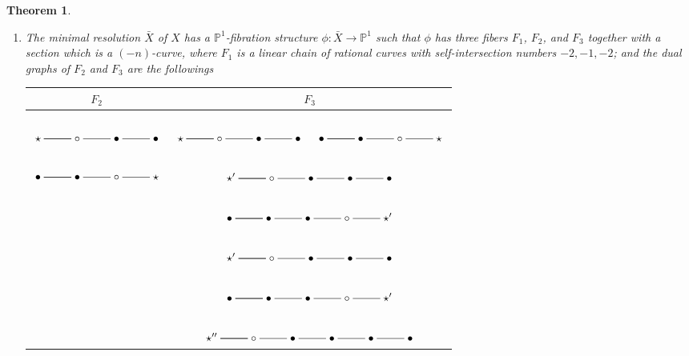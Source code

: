 \documentclass[10pt,oneside,reqno]{amsart}
\newcommand{\pp}{\mathbb{P}}
\newtheorem{theorem}{Theorem}[section]
\theoremstyle{definition}
\theoremstyle{remark}
\numberwithin{equation}{section}
\begin{document}
\begin{theorem}
\begin{enumerate}
$$
\xymatrix@R=0.8em{
&\bullet&&&&\bullet\\
\bullet\ar@{-}[r]&\ast\ar@{-}[r]\ar@{-}[u]&\ast\ar@{-}[r]&\cdots\ar@{-}[r]&\ast\ar@{-}[r]&\ast\ar@{-}[r]\ar@{-}[u]&\bullet
}
$$
where $\bullet$ denotes a $(-2)$-curve, the linear chain of $\ast$'s denotes $R_{k1}$.
\item The minimal resolution $\bar{X}$ of $X$  has a $\pp^1$-fibration structure $\phi:\bar{X} \rightarrow \pp^1$ such that $\phi$ has three fibers $F_1$, $F_2$, and $F_3$ together with a section which is a $(-n)$-curve, where $F_1$ is a linear chain of rational curves with self-intersection numbers $-2,-1,-2$; and
the dual graphs of $F_2$ and $F_3$ are the followings\\
\begin{tabular}{|c|c|}
\hline $F_2$ & $F_3$\\
\hline $\xymatrix@R=0.8em{\\
\star\ar@{-}[r]\ar@{-}[r]&\circ\ar@{-}[r]&\bullet\ar@{-}[r]&\bullet
}$ & $\xymatrix@R=0.8em{\\
\star\ar@{-}[r]\ar@{-}[r]&\circ\ar@{-}[r]&\bullet\ar@{-}[r]&\bullet
}\quad \xymatrix@R=0.8em{\\
\bullet\ar@{-}[r]\ar@{-}[r]&\bullet\ar@{-}[r]&\circ\ar@{-}[r]&\star
}$\\
$\xymatrix@R=0.8em{\\
\bullet\ar@{-}[r]\ar@{-}[r]&\bullet\ar@{-}[r]&\circ\ar@{-}[r]&\star
}$ & $\xymatrix@R=0.8em{\\
\star'\ar@{-}[r]\ar@{-}[r]&\circ\ar@{-}[r]&\bullet\ar@{-}[r]&\bullet\ar@{-}[r]&\bullet
}$\\
& $\xymatrix@R=0.8em{\\
\bullet\ar@{-}[r]\ar@{-}[r]&\bullet\ar@{-}[r]&\bullet\ar@{-}[r]&\circ\ar@{-}[r]&\star'
}$\\
& $\xymatrix@R=0.8em{\\
\star'\ar@{-}[r]\ar@{-}[r]&\circ\ar@{-}[r]&\bullet\ar@{-}[r]&\bullet\ar@{-}[r]&\bullet
}$ \\ & $\xymatrix@R=0.8em{\\
\bullet\ar@{-}[r]\ar@{-}[r]&\bullet\ar@{-}[r]&\bullet\ar@{-}[r]&\circ\ar@{-}[r]&\star'
}$\\
& $\xymatrix@R=0.8em{\\
\star''\ar@{-}[r]\ar@{-}[r]&\circ\ar@{-}[r]&\bullet\ar@{-}[r]&\bullet\ar@{-}[r]&\bullet\ar@{-}[r]&\bullet
}$\\

\end{tabular}
\end{enumerate}
\end{theorem}
\end{document}
